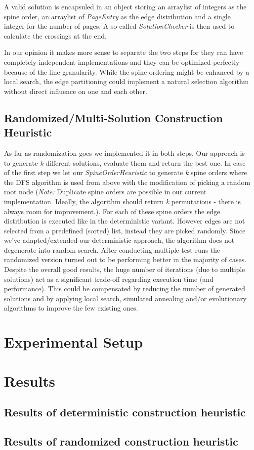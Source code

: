 \documentclass[11pt]{article}
\begin{document}
A valid solution is encapsuled in an object storing an arraylist of integers as the spine order, an arraylist of \textit{PageEntry} as the edge distribution and a single integer for the number of pages. A so-called \textit{SolutionChecker} is then used to calculate the crossings at the end.

In our opinion it makes more sense to separate the two steps for they can have completely independent implementations and they can be optimized perfectly because of the fine granularity. While the spine-ordering might be enhanced by a local search, the edge partitioning could implement a natural selection algorithm without direct influence on one and each other.

\subsection{Randomized/Multi-Solution Construction Heuristic}
As far as randomization goes we implemented it in both steps. Our approach is to generate \textit{k} different solutions, evaluate them and return the best one. In case of the first step we let our \textit{SpineOrderHeuristic} to generate \textit{k} spine orders where the DFS algorithm is used from above with the modification of picking a random root node (\textit{Note:} Duplicate spine orders are possible in our current implementation. Ideally, the algorithm should return \textit{k} permutations - there is always room for improvement.). For each of these spine orders the edge distribution is executed like in the deterministic variant. However edges are not selected from a predefined (sorted) list, instead they are picked randomly. Since we've adapted/extended our deterministic approach, the algorithm does not degenerate into random search. After conducting multiple test-runs the randomized version turned out to be performing better in the majority of cases. Despite the overall good results, the huge number of iterations (due to multiple solutions) act as a significant trade-off regarding execution time (and performance). This could be compensated by reducing the number of generated solutions and by applying local search, simulated annealing and/or evolutionary algorithms to improve the few existing ones.

\section{Experimental Setup}

\newpage
\section{Results}
\subsection{Results of deterministic construction heuristic}
{
\center

}

\subsection{Results of randomized construction heuristic}
{
\center

}
\end{document}
